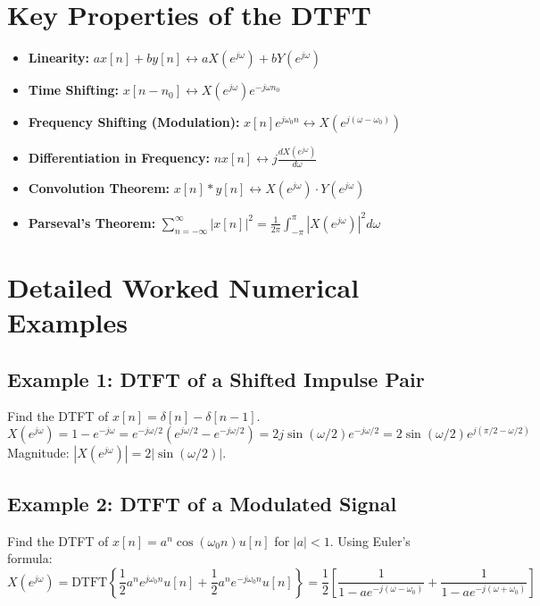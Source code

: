 \documentclass[11pt,a4paper]{article}
\begin{document}
\section{Key Properties of the DTFT}
\begin{itemize}
    \item \textbf{Linearity:} $a x[n] + b y[n] \leftrightarrow a X(e^{j\omega}) + b Y(e^{j\omega})$
    \item \textbf{Time Shifting:} $x[n - n_0] \leftrightarrow X(e^{j\omega}) e^{-j\omega n_0}$
    \item \textbf{Frequency Shifting (Modulation):} $x[n] e^{j\omega_0 n} \leftrightarrow X(e^{j(\omega - \omega_0)})$
    \item \textbf{Differentiation in Frequency:} $n x[n] \leftrightarrow j \frac{d X(e^{j\omega})}{d\omega}$
    \item \textbf{Convolution Theorem:} $x[n] * y[n] \leftrightarrow X(e^{j\omega}) \cdot Y(e^{j\omega})$
    \item \textbf{Parseval's Theorem:} $\sum_{n=-\infty}^{\infty} |x[n]|^2 = \frac{1}{2\pi} \int_{-\pi}^{\pi} |X(e^{j\omega})|^2 d\omega$
\end{itemize}

\section{Detailed Worked Numerical Examples}

\subsection{Example 1: DTFT of a Shifted Impulse Pair}
Find the DTFT of $x[n] = \delta[n] - \delta[n-1]$.
\begin{equation*}
X(e^{j\omega}) = 1 - e^{-j\omega} = e^{-j\omega/2} \left( e^{j\omega/2} - e^{-j\omega/2} \right) = 2j \sin(\omega/2) e^{-j\omega/2} = 2 \sin(\omega/2) e^{j(\pi/2 - \omega/2)}
\end{equation*}
Magnitude: $|X(e^{j\omega})| = 2|\sin(\omega/2)|$.

\subsection{Example 2: DTFT of a Modulated Signal}
Find the DTFT of $x[n] = a^n \cos(\omega_0 n) u[n]$ for $|a| < 1$.
Using Euler's formula:
\begin{equation*}
X(e^{j\omega}) = \text{DTFT}\left\{ \frac{1}{2} a^n e^{j\omega_0 n} u[n] + \frac{1}{2} a^n e^{-j\omega_0 n} u[n] \right\} = \frac{1}{2} \left[ \frac{1}{1 - a e^{-j(\omega - \omega_0)}} + \frac{1}{1 - a e^{-j(\omega + \omega_0)}} \right]
\end{equation*}
\end{document}
